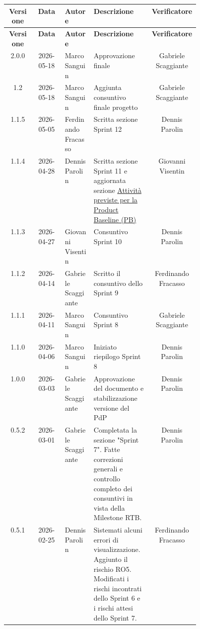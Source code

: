 \documentclass[a4paper,12pt]{article}
\begin{document}
\begin{center}
\small
\renewcommand{\arraystretch}{1.4}

\begin{longtable}{|c|c|>{\raggedright\arraybackslash}p{0.15\linewidth}|>{\raggedright\arraybackslash}p{0.3\linewidth}|c|}
\hline

\rowcolor{gray!60}
\textbf{Versione} & \textbf{Data} & \textbf{Autore} & \textbf{Descrizione} & \textbf{Verificatore} \\
\hline
\endfirsthead

\hline
\rowcolor{gray!60}
\textbf{Versione} & \textbf{Data} & \textbf{Autore} & \textbf{Descrizione} & \textbf{Verificatore} \\
\hline
\endhead
\rowcolor{white}
2.0.0 & 2026-05-18 & Marco Sanguin & Approvazione finale & Gabriele Scaggiante \\
\hline
\rowcolor{gray!20}
1.2 & 2026-05-18 & Marco Sanguin & Aggiunta consuntivo finale progetto & Gabriele Scaggiante \\
\hline
\rowcolor{white}
1.1.5 & 2026-05-05 & Ferdinando Fracasso & Scritta sezione Sprint 12 & Dennis Parolin \\
\hline
\rowcolor{gray!20}
1.1.4 & 2026-04-28 & Dennis Parolin & Scritta sezione Sprint 11 e aggiornata sezione \hyperref[subsec:attivita_previste_pb]{Attività previste per la Product Baseline (PB)} & Giovanni Visentin \\
\hline
\rowcolor{white}
1.1.3 & 2026-04-27 & Giovanni Visentin & Consuntivo Sprint 10 & Dennis Parolin \\
\hline
\rowcolor{gray!20}
1.1.2 & 2026-04-14 & Gabriele Scaggiante & Scritto il consuntivo dello Sprint 9 & Ferdinando Fracasso \\
\hline
\rowcolor{white}
1.1.1 & 2026-04-11 & Marco Sanguin & Consuntivo Sprint 8 & Gabriele Scaggiante \\
\hline
\rowcolor{gray!20}
1.1.0 & 2026-04-06 & Marco Sanguin & Iniziato riepilogo Sprint 8 & Dennis Parolin \\
\hline
\rowcolor{white}
1.0.0 & 2026-03-03 & Gabriele Scaggiante & Approvazione del documento e stabilizzazione versione del PdP & Dennis Parolin \\
\hline
\rowcolor{gray!20}
0.5.2 & 2026-03-01 & Gabriele Scaggiante & Completata la sezione "Sprint 7". Fatte correzioni generali e controllo completo dei consuntivi in vista della Milestone RTB. & Dennis Parolin \\
\hline
\rowcolor{white}
0.5.1 & 2026-02-25 & Dennis Parolin & Sistemati alcuni errori di visualizzazione. Aggiunto il rischio RO5. Modificati i rischi incontrati dello Sprint 6 e i rischi attesi dello Sprint 7. & Ferdinando Fracasso \\

\end{longtable}
\end{center}
\end{document}
